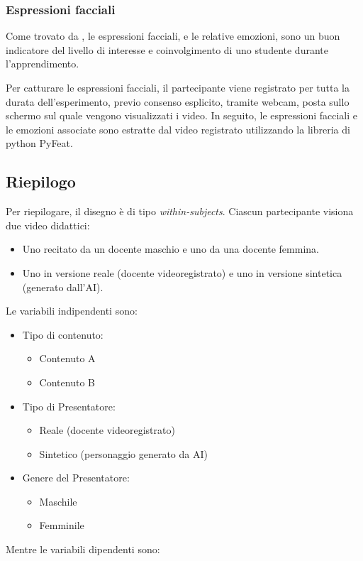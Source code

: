 \subsubsection{Espressioni facciali}

Come trovato da \cite{whitehill2014faces}\cite{zhang2020face}, le espressioni facciali, e le relative emozioni, sono un buon indicatore del livello di interesse e coinvolgimento di uno studente durante l'apprendimento.

Per catturare le espressioni facciali, il partecipante viene registrato per tutta la durata dell'esperimento, previo consenso esplicito, tramite webcam, posta sullo schermo sul quale vengono visualizzati i video. In seguito, le espressioni facciali e le emozioni associate sono estratte dal video registrato utilizzando la libreria di python PyFeat.

\subsection{Riepilogo}

Per riepilogare, il disegno è di tipo \textit{within-subjects}. Ciascun partecipante visiona due video didattici:

\begin{itemize}
    \item Uno recitato da un docente maschio e uno da una docente femmina.
    \item  Uno in versione reale (docente videoregistrato) e uno in versione sintetica (generato dall'AI).
\end{itemize}
Le variabili indipendenti sono:

\begin{itemize}
    \item Tipo di contenuto:
    \begin{itemize}
        \item Contenuto A
        \item Contenuto B
    \end{itemize} 
    \item Tipo di Presentatore:
    \begin{itemize}
        \item Reale (docente videoregistrato)
        \item Sintetico (personaggio generato da AI)
    \end{itemize}
    \item Genere del Presentatore:
    \begin{itemize}
        \item Maschile
        \item Femminile
    \end{itemize}
\end{itemize}
Mentre le variabili dipendenti sono:

